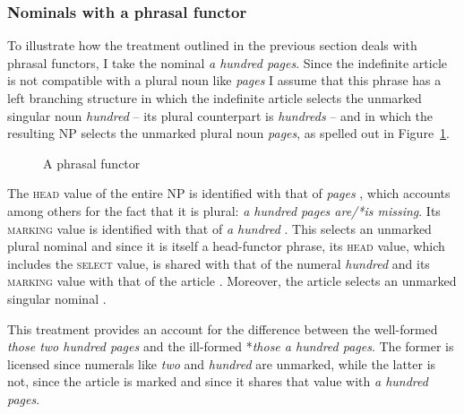 \documentclass[output=paper,biblatex,babelshorthands,newtxmath,draftmode,colorlinks,citecolor=brown]{langscibook}
\begin{document}
        
\subsubsection{Nominals with a phrasal functor} 
\label{sec-phrasal-spec}


To illustrate how the treatment outlined in the previous section deals with phrasal functors, I
take the nominal \emph{a hundred pages}. Since the indefinite article is not 
compatible with a plural noun like \emph{pages} I assume that this phrase  
has a left branching structure in which the indefinite article selects 
the unmarked singular noun \emph{hundred} -- its plural counterpart is \emph{hundreds} --  
and in which the resulting NP selects the unmarked plural noun 
\emph{pages}, as spelled out in Figure~\ref{glorie}. 
 
\begin{figure}
\centering
{}
\caption{\label{glorie} A phrasal functor}
\end{figure}

The \textsc{head} value of the entire NP is identified with that 
of \emph{pages} , which accounts among others for the fact that it is plural:
\emph{a hundred pages are/*is missing}. 
Its \textsc{marking} value is identified with that of \emph{a hundred} 
. This selects an unmarked plural nominal  and 
since it is itself a head-functor phrase, its \textsc{head} value, which includes 
the \textsc{select} value, is shared with 
that of the numeral \emph{hundred}  and its \textsc{marking} value 
with that of the article . Moreover, the article selects an unmarked 
singular nominal .
 
This treatment provides an account for the difference between 
the well-formed \emph{those two hundred pages} and the 
ill-formed *\emph{those a hundred pages}. The former is licensed since numerals 
like \emph{two} and \emph{hundred} are unmarked, while the latter is not, since 
the article is marked and since it shares that value with \emph{a hundred pages}.  
\end{document}

